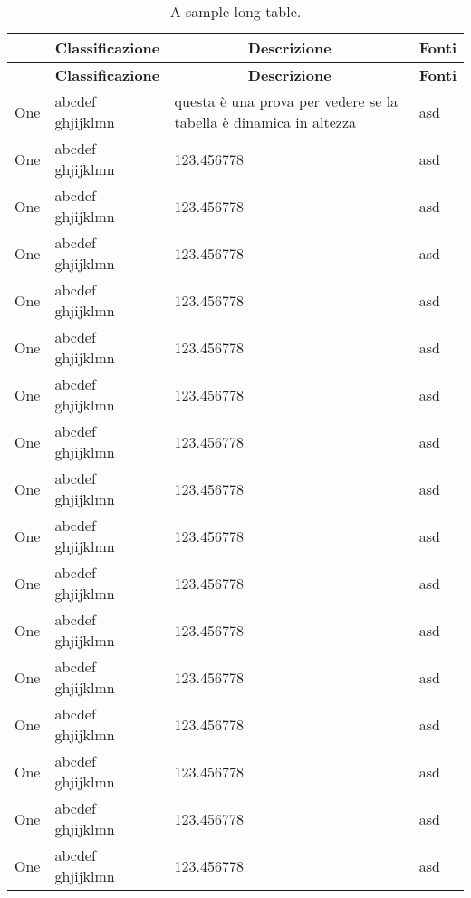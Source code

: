 \begingroup
\renewcommand\arraystretch{1.5}
\begin{longtable}{lXp{5cm}X}
	\caption{A sample long table.} \label{tab:long} \\
	\rowcolorhead 
	\multicolumn{1}{c}{\colorhead \textbf{Requisito}} & \multicolumn{1}{c}{ \textbf{Classificazione}} & \multicolumn{1}{c}{ \textbf{Descrizione}}  & \multicolumn{1}{c}{ \textbf{Fonti}} \\
	\endfirsthead
	\rowcolorhead 
	\multicolumn{1}{c}{\colorhead \textbf{Requisito}} & \multicolumn{1}{c}{ \textbf{Classificazione}} & \multicolumn{1}{c}{ \textbf{Descrizione}}  & \multicolumn{1}{c}{ \textbf{Fonti}} \\
	\endhead
	\endfoot
	\endlastfoot
	
	\rowcolorlight One & abcdef ghjijklmn & questa è una prova per vedere se la tabella è dinamica in altezza & asd \\
	\rowcolordark One & abcdef ghjijklmn & 123.456778 & asd \\
	\rowcolorlight One & abcdef ghjijklmn & 123.456778 & asd \\
	\rowcolordark One & abcdef ghjijklmn & 123.456778 & asd \\
	\rowcolorlight One & abcdef ghjijklmn & 123.456778 & asd \\
	\rowcolordark One & abcdef ghjijklmn & 123.456778 & asd \\
	\rowcolorlight One & abcdef ghjijklmn & 123.456778 & asd \\
	\rowcolordark One & abcdef ghjijklmn & 123.456778 & asd \\
	\rowcolorlight One & abcdef ghjijklmn & 123.456778 & asd \\
	\rowcolordark One & abcdef ghjijklmn & 123.456778 & asd \\
	\rowcolorlight One & abcdef ghjijklmn & 123.456778 & asd \\
	\rowcolordark One & abcdef ghjijklmn & 123.456778 & asd \\
	\rowcolorlight One & abcdef ghjijklmn & 123.456778 & asd \\
	\rowcolordark One & abcdef ghjijklmn & 123.456778 & asd \\
	\rowcolorlight One & abcdef ghjijklmn & 123.456778 & asd \\
	\rowcolordark One & abcdef ghjijklmn & 123.456778 & asd \\
	\rowcolorlight One & abcdef ghjijklmn & 123.456778 & asd \\

\end{longtable}
